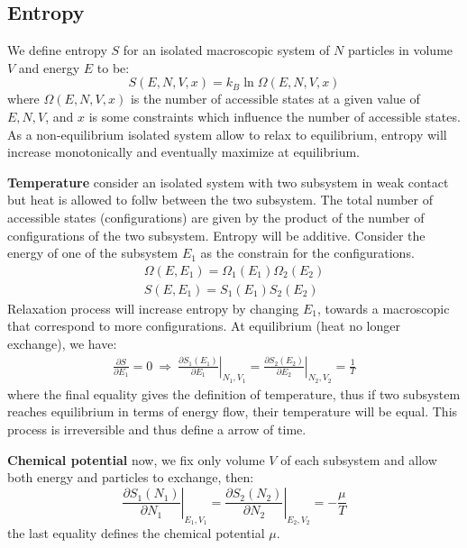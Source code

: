 \documentclass{article}
\begin{document}
\subsection{Entropy}
We define entropy $S$ for an isolated macroscopic system of $N$ particles in volume $V$ and energy $E$ to be:
\begin{equation}
    S(E,N,V,x) = k_B \ln\Omega(E,N,V,x)
\end{equation}
where $\Omega(E,N,V,x)$ is the number of accessible states at a given value of $E, N, V$, and $x$ is some constraints which 
influence the number of accessible states.
As a non-equilibrium isolated system allow to relax to equilibrium, entropy will increase monotonically and eventually maximize 
at equilibrium.

\textbf{Temperature} 
consider an isolated system with two subsystem in weak contact but heat is allowed to follw between the two subsystem.
The total number of accessible states (configurations) are given by the product of the number of configurations of the 
two subsystem. Entropy will be additive. Consider the energy of one of the subsystem $E_1$
as the constrain for the configurations.
\begin{align}
    \Omega(E,E_1) = \Omega_1(E_1) \Omega_2(E_2) \\
    S(E,E_1) = S_1(E_1) S_2(E_2)   
\end{align}
Relaxation process will increase entropy by changing $E_1$, towards a macroscopic that correspond to 
more configurations. At equilibrium (heat no longer exchange), we have:
\begin{gather}
    \frac{\partial S}{\partial E_1} = 0 \ \Rightarrow \ 
    \left. \frac{\partial S_1(E_1)}{\partial E_1} \right|_{N_1,V_1} = \left. \frac{\partial S_2(E_2)}{\partial E_2}\right|_{N_2,V_2} = \frac{1}{T} \label{defineT}
\end{gather}
where the final equality gives the definition of temperature, thus if two subsystem reaches equilibrium in terms of energy flow, their 
temperature will be equal. This process is irreversible and thus define a arrow of time.

\textbf{Chemical potential}
now, we fix only volume $V$ of each subsystem and allow both energy and particles to exchange, then:
\begin{equation}
    \left. \frac{\partial S_1(N_1)}{\partial N_1} \right|_{E_1,V_1} = \left. \frac{\partial S_2(N_2)}{\partial N_2}\right|_{E_2,V_2} = -\frac{\mu}{T}
\end{equation}
the last equality defines the chemical potential $\mu$. 
\end{document}

